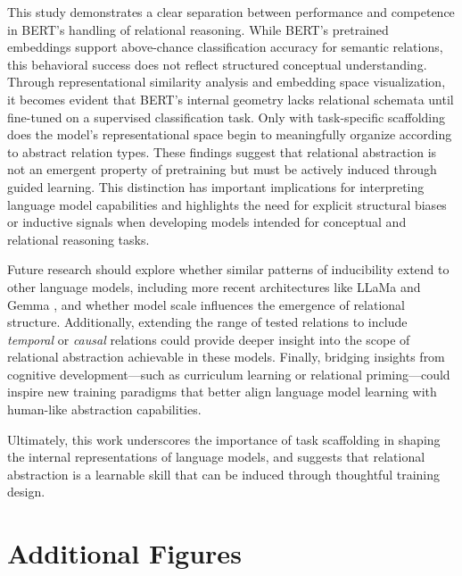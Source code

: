 \documentclass[stu,floatsintext]{apa7}
\begin{document}
This study demonstrates a clear separation between performance and competence in BERT's handling of relational reasoning. While BERT’s pretrained embeddings support above-chance classification accuracy for semantic relations, this behavioral success does not reflect structured conceptual understanding. Through representational similarity analysis and embedding space visualization, it becomes evident that BERT’s internal geometry lacks relational schemata until fine-tuned on a supervised classification task. Only with task-specific scaffolding does the model's representational space begin to meaningfully organize according to abstract relation types. These findings suggest that relational abstraction is not an emergent property of pretraining but must be actively induced through guided learning. This distinction has important implications for interpreting language model capabilities and highlights the need for explicit structural biases or inductive signals when developing models intended for conceptual and relational reasoning tasks.

Future research should explore whether similar patterns of inducibility extend to other language models, including more recent architectures like LLaMa \parencite{https://doi.org/10.48550/arxiv.2302.13971} and Gemma \parencite{gemmateam2024gemmaopenmodelsbased}, and whether model scale influences the emergence of relational structure. Additionally, extending the range of tested relations to include \textit{temporal} or \textit{causal} relations could provide deeper insight into the scope of relational abstraction achievable in these models. Finally, bridging insights from cognitive development—such as curriculum learning or relational priming—could inspire new training paradigms that better align language model learning with human-like abstraction capabilities.

Ultimately, this work underscores the importance of task scaffolding in shaping the internal representations of language models, and suggests that relational abstraction is a learnable skill that can be induced through thoughtful training design.

\printbibliography

\appendix
\section{Additional Figures}
\end{document}
